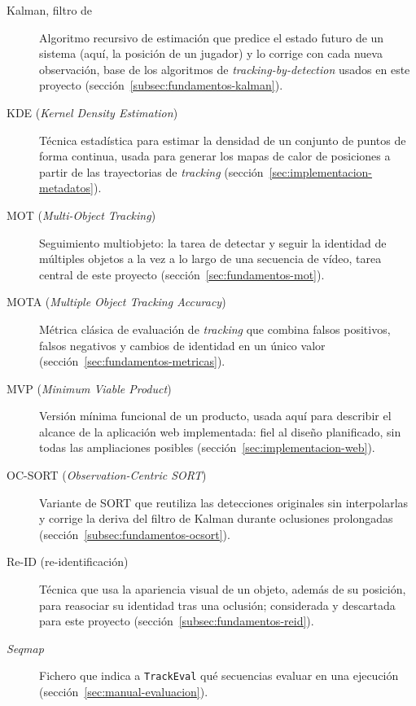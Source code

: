 \begin{description}
\item[Kalman, filtro de] Algoritmo recursivo de estimación que predice el
  estado futuro de un sistema (aquí, la posición de un jugador) y lo
  corrige con cada nueva observación, base de los algoritmos de
  \emph{tracking-by-detection} usados en este proyecto
  (sección~\ref{subsec:fundamentos-kalman}).

\item[KDE (\emph{Kernel Density Estimation})] Técnica estadística para
  estimar la densidad de un conjunto de puntos de forma continua, usada
  para generar los mapas de calor de posiciones a partir de las
  trayectorias de \emph{tracking} (sección~\ref{sec:implementacion-metadatos}).

\item[MOT (\emph{Multi-Object Tracking})] Seguimiento multiobjeto: la
  tarea de detectar y seguir la identidad de múltiples objetos a la vez a
  lo largo de una secuencia de vídeo, tarea central de este proyecto
  (sección~\ref{sec:fundamentos-mot}).

\item[MOTA (\emph{Multiple Object Tracking Accuracy})] Métrica clásica de
  evaluación de \emph{tracking} que combina falsos positivos, falsos
  negativos y cambios de identidad en un único valor
  (sección~\ref{sec:fundamentos-metricas}).

\item[MVP (\emph{Minimum Viable Product})] Versión mínima funcional de un
  producto, usada aquí para describir el alcance de la aplicación web
  implementada: fiel al diseño planificado, sin todas las ampliaciones
  posibles (sección~\ref{sec:implementacion-web}).

\item[OC-SORT (\emph{Observation-Centric SORT})] Variante de SORT que
  reutiliza las detecciones originales sin interpolarlas y corrige la
  deriva del filtro de Kalman durante oclusiones prolongadas
  (sección~\ref{subsec:fundamentos-ocsort}).

\item[Re-ID (re-identificación)] Técnica que usa la apariencia visual de
  un objeto, además de su posición, para reasociar su identidad tras una
  oclusión; considerada y descartada para este proyecto
  (sección~\ref{subsec:fundamentos-reid}).

\item[\emph{Seqmap}] Fichero que indica a \texttt{TrackEval} qué
  secuencias evaluar en una ejecución
  (sección~\ref{sec:manual-evaluacion}).


\end{description}
